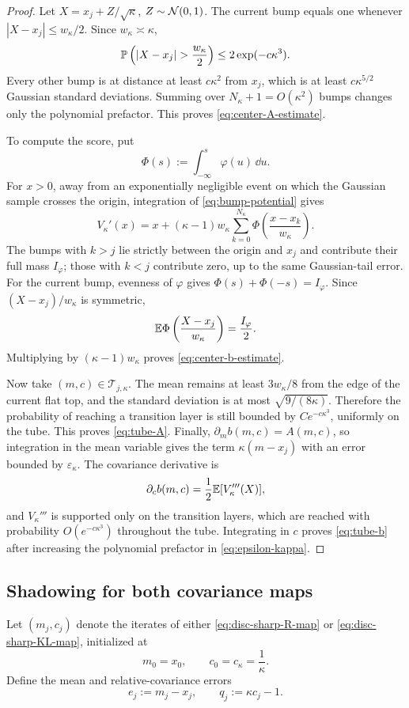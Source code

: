 \begin{proof}
Let $X=x_j+Z/\sqrt\kappa$, $Z\sim\mathcal{N}(0,1)$.  The current bump equals one whenever
$|X-x_j|\leq w_\kappa/2$.  Since $w_\kappa\asymp\kappa$,
\[
    \Prob\left(|X-x_j|>\frac{w_\kappa}{2}\right)
    \leq2\exp(-c\kappa^3).
\]
Every other bump is at distance at least $c\kappa^2$ from $x_j$, which is at least
$c\kappa^{5/2}$ Gaussian standard deviations.  Summing over
$N_\kappa+1=O(\kappa^2)$ bumps changes only the polynomial prefactor.  This proves
\eqref{eq:center-A-estimate}.

To compute the score, put
\[
    \Phi(s):=\int_{-\infty}^{s}\varphi(u)\,\dd u.
\]
For $x>0$, away from an exponentially negligible event on which the Gaussian sample crosses
the origin, integration of \eqref{eq:bump-potential} gives
\[
    V_\kappa'(x)
    =x+(\kappa-1)w_\kappa
      \sum_{k=0}^{N_\kappa}
      \Phi\left(\frac{x-x_k}{w_\kappa}\right).
\]
The bumps with $k>j$ lie strictly between the origin and $x_j$ and contribute their full
mass $I_\varphi$; those with $k<j$ contribute zero, up to the same Gaussian-tail error.
For the current bump, evenness of $\varphi$ gives
$\Phi(s)+\Phi(-s)=I_\varphi$.  Since $(X-x_j)/w_\kappa$ is symmetric,
\[
    \mathbb{E}\Phi\left(\frac{X-x_j}{w_\kappa}\right)=\frac{I_\varphi}{2}.
\]
Multiplying by $(\kappa-1)w_\kappa$ proves \eqref{eq:center-b-estimate}.

Now take $(m,c)\in\mathcal T_{j,\kappa}$.  The mean remains at least $3w_\kappa/8$
from the edge of the current flat top, and the standard deviation is at most
$\sqrt{9/(8\kappa)}$.  Therefore the probability of reaching a transition layer is still
bounded by $C e^{-c\kappa^3}$, uniformly on the tube.  This proves \eqref{eq:tube-A}.
Finally, $\partial_m b(m,c)=A(m,c)$, so integration in the mean variable gives the term
$\kappa(m-x_j)$ with an error bounded by $\varepsilon_\kappa$.  The covariance derivative
is
\[
    \partial_c b(m,c)=\frac12\mathbb{E}[V_\kappa'''(X)],
\]
and $V_\kappa'''$ is supported only on the transition layers, which are reached with
probability $O(e^{-c\kappa^3})$ throughout the tube.  Integrating in $c$ proves
\eqref{eq:tube-b} after increasing the polynomial prefactor in \eqref{eq:epsilon-kappa}.
\end{proof}

\subsection{Shadowing for both covariance maps}

Let $(m_j,c_j)$ denote the iterates of either \eqref{eq:disc-sharp-R-map} or
\eqref{eq:disc-sharp-KL-map}, initialized at
\begin{equation}
\label{eq:disc-sharp-init}
    m_0=x_0,
    \qquad
    c_0=c_\kappa=\frac1\kappa.
\end{equation}
Define the mean and relative-covariance errors
\begin{equation}
\label{eq:shadow-errors}
    e_j:=m_j-x_j,
    \qquad
    q_j:=\kappa c_j-1.
\end{equation}

